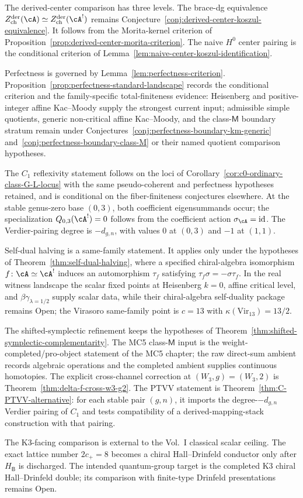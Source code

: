 The derived-center comparison has three levels. The
brace-dg equivalence
$Z^{\mathrm{der}}_{\mathrm{ch}}(\cA)\simeq
Z^{\mathrm{der}}_{\mathrm{ch}}(\cA^!)$ remains
Conjecture~\ref{conj:derived-center-koszul-equivalence}. It follows
from the Morita-kernel criterion of
Proposition~\ref{prop:derived-center-morita-criterion}. The naive
$H^0$ center pairing is the conditional criterion of
Lemma~\ref{lem:naive-center-koszul-identification}.

Perfectness is governed by
Lemma~\ref{lem:perfectness-criterion}.  Proposition~\ref{prop:perfectness-standard-landscape}
records the conditional criterion and the family-specific
total-finiteness evidence: Heisenberg and positive-integer affine
Kac--Moody supply the strongest current input; admissible simple
quotients, generic non-critical affine Kac--Moody, and the
class-$\mathsf{M}$ boundary stratum remain under
Conjectures~\ref{conj:perfectness-boundary-km-generic}
and~\ref{conj:perfectness-boundary-class-M} or their named quotient
comparison hypotheses.

The $C_1$ reflexivity statement follows on the loci of
Corollary~\ref{cor:c0-ordinary-class-G-L-locus} with the same
pseudo-coherent and perfectness hypotheses retained, and is
conditional on the fiber-finiteness conjectures elsewhere.  At the
stable genus-zero base \((0,3)\), both coefficient eigensummands
occur; the specialization \(Q_{0,3}(\cA^!)=0\) follows from the
coefficient action \(\sigma_\cA=\mathrm{id}\).  The Verdier-pairing
degree is \(-d_{g,n}\), with values \(0\) at \((0,3)\) and \(-1\)
at \((1,1)\).

Self-dual halving is a same-family statement. It applies only under
the hypotheses of Theorem~\ref{thm:self-dual-halving}, where a
specified chiral-algebra isomorphism $f\colon\cA\simeq\cA^!$ induces
an automorphism $\tau_f$ satisfying
$\tau_f\sigma=-\sigma\tau_f$. In the real witness landscape the scalar
fixed points at Heisenberg $k=0$, affine critical level, and
$\beta\gamma_{\lambda=1/2}$ supply scalar data, while their
chiral-algebra self-duality package remains Open; the Virasoro
same-family point is $c=13$ with
$\kappa(\mathrm{Vir}_{13})=13/2$.

The shifted-symplectic refinement keeps the hypotheses of
Theorem~\ref{thm:shifted-symplectic-complementarity}. The MC5
class-$\mathsf{M}$ input is the weight-completed/pro-object statement
of the MC5 chapter; the raw direct-sum ambient records algebraic
operations and the completed ambient supplies continuous homotopies.
The explicit cross-channel correction at
$(W_3,g)=(W_3,2)$ is
Theorem~\textup{\ref{thm:delta-f-cross-w3-g2}}. The PTVV statement
is Theorem~\ref{thm:C-PTVV-alternative}: for each stable pair
\((g,n)\), it imports the degree-\(-d_{g,n}\) Verdier pairing of
$C_1$ and tests compatibility of a derived-mapping-stack construction
with that pairing.

The K3-facing comparison is external to the Vol.~I classical scalar
ceiling. The exact lattice number $2c_+=8$ becomes a chiral
Hall--Drinfeld conductor only after $H_{\mathsf B}$ is discharged.
The intended quantum-group target is the completed K3 chiral
Hall--Drinfeld double; its comparison with finite-type Drinfeld
presentations remains Open.
